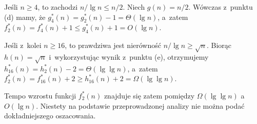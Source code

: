 Jeśli $n\ge4$, to zachodzi $n/\!\lg n\le n/2$.
Niech $g(n)=n/2$.
Wówczas z~punktu (d) mamy, że $g_4^*(n)=g_2^*(n)-1=\Theta(\lg n)$, a~zatem $f_2^*(n)=f_4^*(n)+1\le g_4^*(n)+1=O(\lg n)$.

Jeśli z~kolei $n\ge16$, to prawdziwa jest nierówność $n/\!\lg n\ge\sqrt{n}$.
Biorąc $h(n)=\sqrt{n}$ i~wykorzystując wynik z~punktu (e), otrzymujemy $h_{16}^*(n)=h_2^*(n)-2=\Theta(\lg\lg n)$, a~zatem $f_2^*(n)=f_{16}^*(n)+2\ge h_{16}^*(n)+2=\Omega(\lg\lg n)$.

Tempo wzrostu funkcji $f_2^*(n)$ znajduje się zatem pomiędzy $\Omega(\lg\lg n)$ a~$O(\lg n)$.
Niestety na podstawie przeprowadzonej analizy nie można podać dokładniejszego oszacowania.

\endinput
